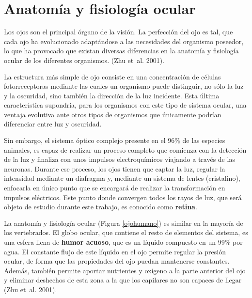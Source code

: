 \documentclass[
  12pt,
  spanish,
  a4paperpaper,
]{report}
\begin{document}
\hypertarget{anatomuxeda-y-fisiologuxeda-ocular}{%
\section{Anatomía y fisiología
ocular}\label{anatomuxeda-y-fisiologuxeda-ocular}}

Los ojos son el principal órgano de la visión. La perfección del ojo es
tal, que cada ojo ha evolucionado adaptándose a las necesidades del
organismo poseedor, lo que ha provocado que existan diversas diferencias
en la anatomía y fisiología ocular de los diferentes organismos. (Zhu
et~al. 2001).

La estructura más simple de ojo consiste en una concentración de células
fotorreceptoras mediante las cuales un organismo puede distinguir, no
sólo la luz y la oscuridad, sino también la dirección de la luz
incidente. Esta última característica supondría, para los organismos con
este tipo de sistema ocular, una ventaja evolutiva ante otros tipos de
organismos que únicamente podrían diferenciar entre luz y oscuridad.

Sin embargo, el sistema óptico complejo presente en el 96\% de las
especies animales, es capaz de realizar un proceso completo que comienza
con la detección de la luz y finaliza con unos impulsos electroquímicos
viajando a través de las neuronas. Durante ese proceso, los ojos tienen
que captar la luz, regular la intensidad mediante un diafragma y,
mediante un sistema de lentes (cristalino), enfocarla en único punto que
se encargará de realizar la transformación en impulsos eléctricos. Este
punto donde convergen todos los rayos de luz, que será objeto de estudio
durante este trabajo, es conocido como \textbf{retina}.

La anatomía y fisiología ocular (Figura \ref{ojohumano}) es similar en
la mayoría de los vertebrados. El globo ocular, que contiene el resto de
elementos del sistema, es una esfera llena de \textbf{humor acuoso}, que
es un líquido compuesto en un 99\% por agua. El constante flujo de este
líquido en el ojo permite regular la presión ocular, de forma que las
propiedades del ojo puedan mantenerse constantes. Además, también
permite aportar nutrientes y oxígeno a la parte anterior del ojo y
eliminar deshechos de esta zona a la que los capilares no son capaces de
llegar (Zhu et~al. 2001).
\end{document}
